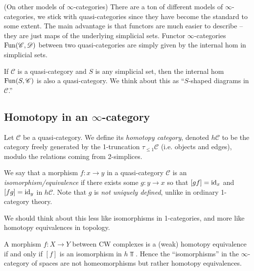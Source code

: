 \documentclass[11pt,openany]{book}
\begin{document}
\begin{remark} (On other models of $\infty$-categories) There are a ton of different models of $\infty$-categories, we stick with quasi-categories since they have become the standard to some extent. The main advantage is that functors are much easier to describe -- they are just maps of the underlying simplicial sets. Functor $\infty$-categories $\mathrm{Fun}(\mathscr{C},\mathscr{D})$ between two quasi-categories are simply given by the internal hom in simplicial sets.
\end{remark}

\begin{proposition} If $\mathscr{C}$ is a quasi-category and $S$ is any simplicial set, then the internal hom $\mathrm{Fun}(S,\mathscr{C})$ is also a quasi-category. We think about this as ``$S$-shaped diagrams in $\mathscr{C}$.''
\end{proposition}



\subsection{Homotopy in an $\infty$-category}



\begin{definition}\label{def:homotopy-category-of-quasicategory} 
Let $\mathscr{C}$ be a quasi-category. We define its \textit{homotopy category}, denoted $h\mathscr{C}$ to be the category freely generated by the 1-truncation $\tau_{\le 1} \mathscr{C}$ (i.e. objects and edges), modulo the relations coming from 2-simplices.
\end{definition}

\begin{definition} We say that a morphism $f \colon x \to y$ in a quasi-category $\mathscr{C}$ is an \textit{isomorphism/equivalence} if there exists some $g \colon y \to x$ so that $[gf]=\mathrm{id}_x$ and $[fg]=\mathrm{id}_y$ in $h\mathscr{C}$. Note that $g$ is \textit{not uniquely defined}, unlike in ordinary 1-category theory.
\end{definition}

\begin{remark} We should think about this less like isomorphisms in 1-categories, and more like homotopy equivalences in topology.
\end{remark}

\begin{example} A morphism $f\colon X\to Y$ between CW complexes is a (weak) homotopy equivalence if and only if $[f]$ is an isomorphism in $h\Top$. Hence the ``isomorphisms'' in the $\infty$-category of spaces are not homeomorphisms but rather homotopy equivalences.
\end{example}
\end{document}

